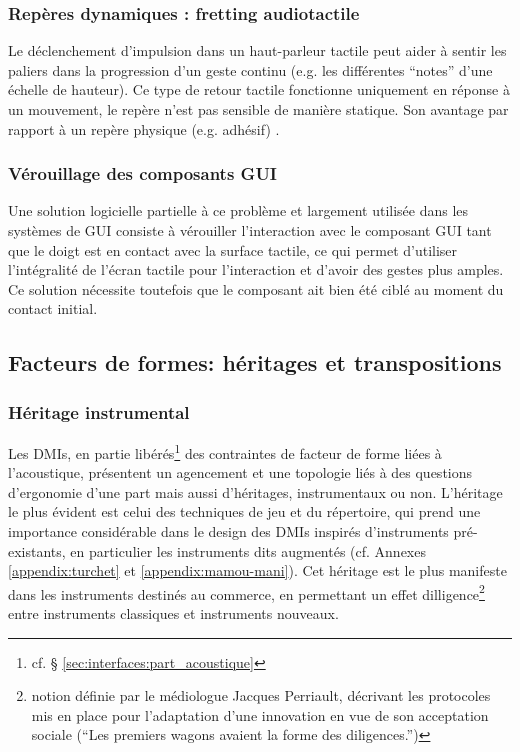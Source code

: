 \subsubsection{Repères dynamiques : fretting audiotactile}
\label{sec:audio-fretting}
\noindent Le déclenchement d'impulsion dans un haut-parleur tactile peut aider à sentir les paliers dans la progression d'un geste continu (e.g. les différentes ``notes'' d'une échelle de hauteur). Ce type de retour tactile fonctionne uniquement en réponse à un mouvement, le repère n'est pas sensible de manière statique. Son avantage par rapport à un repère physique (e.g. adhésif) .\\

\subsubsection{Vérouillage des composants GUI}
\noindent Une solution logicielle partielle à ce problème et largement utilisée dans les systèmes de \gls{GUI} consiste à vérouiller l'interaction avec le composant GUI tant que le doigt est en contact avec la surface tactile, ce qui permet d'utiliser l'intégralité de l'écran tactile pour l'interaction et d'avoir des gestes plus amples. Ce solution nécessite toutefois que le composant ait bien été ciblé au moment du contact initial.



\subsection{Facteurs de formes: héritages et transpositions}

\subsubsection{Héritage instrumental}

\noindent Les \glspl{DMI}, en partie libérés\footnote{cf. § \ref{sec:interfaces:part_acoustique}} des contraintes de facteur de forme liées à l'acoustique, présentent un agencement et une topologie liés à des questions d'ergonomie d'une part mais aussi d'héritages, instrumentaux ou non. L'héritage le plus évident est celui des techniques de jeu et du répertoire, qui prend une importance considérable dans le design des \glspl{DMI} inspirés d'instruments pré-existants, en particulier les instruments dits augmentés (cf. Annexes \ref{appendix:turchet} et \ref{appendix:mamou-mani}). Cet héritage est le plus manifeste dans les instruments destinés au commerce, en permettant un effet dilligence\footnote{notion définie par le médiologue Jacques Perriault, décrivant les protocoles mis en place pour l'adaptation d'une innovation en vue de son acceptation sociale (``Les premiers wagons avaient la forme des diligences.'')} entre instruments classiques et instruments nouveaux.\\

